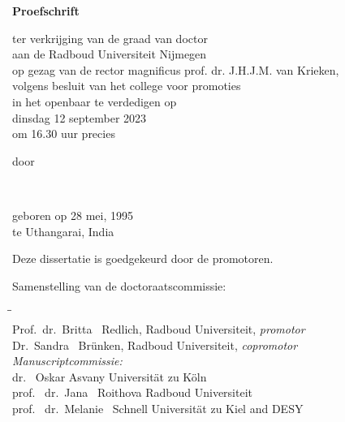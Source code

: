 \begin{titlepage}
\begin{center}
        {\Large\titlefont\bfseries Proefschrift}

        \bigskip
        \bigskip

        ter verkrijging van de graad van doctor\\
        aan de Radboud Universiteit Nijmegen\\
        op gezag van de rector magnificus prof. dr. J.H.J.M. van Krieken,\\
        volgens besluit van het college voor promoties\\
        in het openbaar te verdedigen op\\

        \bigskip
        dinsdag 12 september 2023\\
        om 16.30 uur precies\\
        \bigskip
        \bigskip

        door
        \bigskip
        \bigskip

        \makeatletter
        {\Large\titlefont\bfseries\@firstnames\ \MakeUppercase{\titleshape\@lastname}}
        \makeatother

        \bigskip
        \bigskip

        geboren op 28 mei, 1995\\
        te Uthangarai, India\\

        \vspace*{2\bigskipamount}

    \end{center}
    \clearpage
    \thispagestyle{empty}

    \noindent Deze dissertatie is goedgekeurd door de promotoren.

    \bigskip
    \noindent Samenstelling van de doctoraatscommissie:

    
    \begin{tabbing}
        \hspace{\tabcolsep}\=\hspace{0.33\textwidth}\=\hspace{0.66\textwidth}                   \\[-3\medskipamount]
        \> Prof.\ dr.\ Britta \ Redlich,    \> Radboud Universiteit, \textit{promotor}      \\
        \> Dr.\ Sandra \ Br\"{u}nken,        \> Radboud Universiteit, \textit{copromotor}    \\[\medskipamount]
        \>\textit{Manuscriptcommissie:}  \\[\smallskipamount]
        \> dr. \ Oskar Asvany            \> Universit\"{a}t zu K\"{o}ln \\
        \> prof. \ dr.\ Jana \ Roithova            \> Radboud Universiteit \\
        \> prof. \ dr.\ Melanie \ Schnell   \> Universit\"{a}t zu Kiel and DESY \\[\medskipamount]
    \end{tabbing}
\end{titlepage}

